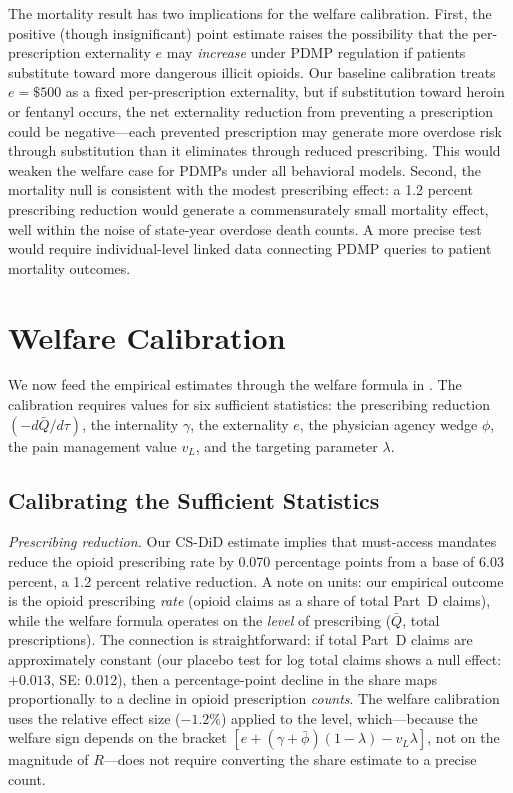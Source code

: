 \documentclass[12pt]{article}
\begin{document}
The mortality result has two implications for the welfare calibration. First, the positive (though insignificant) point estimate raises the possibility that the per-prescription externality $e$ may \textit{increase} under PDMP regulation if patients substitute toward more dangerous illicit opioids. Our baseline calibration treats $e = \$500$ as a fixed per-prescription externality, but if substitution toward heroin or fentanyl occurs, the net externality reduction from preventing a prescription could be negative---each prevented prescription may generate more overdose risk through substitution than it eliminates through reduced prescribing. This would weaken the welfare case for PDMPs under all behavioral models. Second, the mortality null is consistent with the modest prescribing effect: a 1.2 percent prescribing reduction would generate a commensurately small mortality effect, well within the noise of state-year overdose death counts. A more precise test would require individual-level linked data connecting PDMP queries to patient mortality outcomes.


\section{Welfare Calibration}\label{sec:welfare}

We now feed the empirical estimates through the welfare formula in . The calibration requires values for six sufficient statistics: the prescribing reduction $(-d\bar{Q}/d\tau)$, the internality $\gamma$, the externality $e$, the physician agency wedge $\phi$, the pain management value $v_L$, and the targeting parameter $\lambda$.

\subsection{Calibrating the Sufficient Statistics}\label{sec:welfare_calibration}

\textit{Prescribing reduction.} Our CS-DiD estimate implies that must-access mandates reduce the opioid prescribing rate by 0.070 percentage points from a base of 6.03 percent, a 1.2 percent relative reduction. A note on units: our empirical outcome is the opioid prescribing \textit{rate} (opioid claims as a share of total Part~D claims), while the welfare formula operates on the \textit{level} of prescribing ($\bar{Q}$, total prescriptions). The connection is straightforward: if total Part~D claims are approximately constant (our placebo test for log total claims shows a null effect: $+0.013$, SE: 0.012), then a percentage-point decline in the share maps proportionally to a decline in opioid prescription \textit{counts}. The welfare calibration uses the relative effect size ($-1.2\%$) applied to the level, which---because the welfare sign depends on the bracket $[e + (\gamma + \bar{\phi})(1-\lambda) - v_L\lambda]$, not on the magnitude of $R$---does not require converting the share estimate to a precise count.
\end{document}
